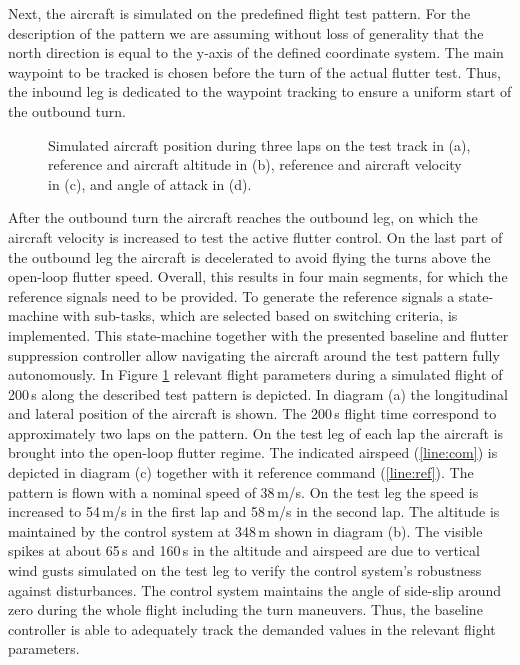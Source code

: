 \documentclass[aerospace,article,submit,moreauthors,pdftex,10pt,a4paper]{Definitions/mdpi}
\begin{document}
\newpage
Next, the aircraft is simulated on the predefined flight test pattern.  For the description of the pattern we are assuming without loss of generality that the north direction is equal to the y-axis of the defined coordinate system. The main waypoint to be tracked is chosen before the turn of the actual flutter test. Thus, the inbound leg is dedicated to the waypoint tracking to ensure a uniform start of the outbound turn. 
\begin{figure}[b!]
	\centering
	
	\caption{Simulated aircraft position during three laps on the test track in (a), reference and aircraft altitude in (b), reference and aircraft velocity in (c), and angle of attack in (d).}
	\label{fig:d1_patt_fp}	
\end{figure}
After the outbound turn the aircraft reaches the outbound leg, on which the aircraft velocity is increased to test the active flutter control.  On the last part of the outbound leg the aircraft is decelerated to avoid flying the turns above the open-loop flutter speed. Overall, this results in four main segments, for which the reference signals need to be provided. To generate the reference signals  a state-machine with sub-tasks, which are selected based on switching criteria, is implemented.
This state-machine together with the presented baseline and flutter suppression controller allow navigating the aircraft around the test pattern fully autonomously. In Figure \ref{fig:d1_patt_fp} relevant flight parameters during a simulated flight of 200\,s along the described test pattern is depicted. In diagram (a) the longitudinal and lateral position of the aircraft is shown. The 200\,s flight time correspond to approximately two laps on the pattern. On the test leg of each lap the aircraft is brought into the open-loop flutter regime. The  indicated airspeed (\ref{line:com}) is depicted in diagram (c) together with it reference command (\ref{line:ref}). The pattern is flown with a nominal speed of 38\,m/s. On the test leg the speed is increased to 54\,m/s in the first lap and 58\,m/s in the second lap. The altitude is maintained by the control system at 348\,m shown in diagram (b). The visible spikes at about 65\,s and 160\,s in the altitude and airspeed are due to vertical wind gusts simulated on the test leg to verify the control system's robustness  against disturbances. The control system maintains the angle of side-slip around zero during the whole flight including the turn maneuvers. Thus, the baseline controller is able to adequately track the demanded values in the relevant flight parameters.
\end{document}
